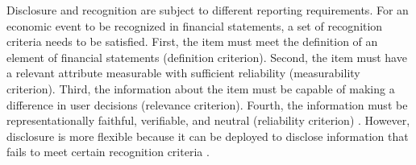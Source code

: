 \documentclass[letterpaper,11pt]{article}
\begin{document}
\begin{spacing}{1.5}
Disclosure and recognition are subject to different reporting requirements. For an economic event to be recognized in financial statements, a set of recognition criteria needs to be satisfied. First, the item must meet the definition of an element of financial statements (definition criterion). Second, the item must have a relevant attribute measurable with sufficient reliability (measurability criterion). Third, the information about the item must be capable of making a difference in user decisions (relevance criterion). Fourth, the information must be representationally faithful, verifiable, and neutral (reliability criterion) \cite{fasbStatementFinancialAccounting1984}. However, disclosure is more flexible because it can be deployed to disclose information that fails to meet certain recognition criteria \cite[par. 7b]{fasbStatementFinancialAccounting1984}. 


\end{spacing}
\end{document}
